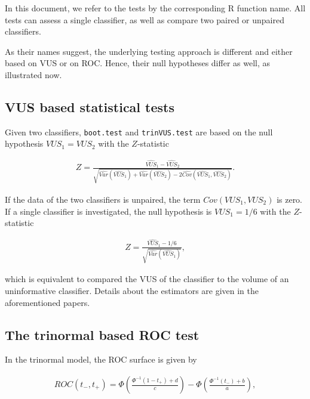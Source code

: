 \documentclass[
]{article}
\begin{document}
In this document, we refer to the tests by the corresponding R function
name. All tests can assess a single classifier, as well as compare two
paired or unpaired classifiers.

As their names suggest, the underlying testing approach is different and
either based on VUS or on ROC. Hence, their null hypotheses differ as
well, as illustrated now.

\hypertarget{vus-based-statistical-tests}{%
\subsection{VUS based statistical
tests}\label{vus-based-statistical-tests}}

Given two classifiers, \texttt{boot.test} and \texttt{trinVUS.test} are
based on the null hypothesis \(VUS_1 = VUS_2\) with the \(Z\)-statistic

\begin{align*}
Z =  \frac{\widehat{VUS}_1 - \widehat{VUS}_2}{\sqrt{\widehat{Var}(\widehat{VUS}_1) + \widehat{Var}(\widehat{VUS}_2) - 2 \widehat{Cov}(\widehat{VUS}_1,\widehat{VUS}_2)}}.
\end{align*}

If the data of the two classifiers is unpaired, the term
\(Cov(VUS_1,VUS_2)\) is zero. If a single classifier is investigated,
the null hypothesis is \(VUS_1 = 1/6\) with the \(Z\)-statistic

\begin{align*}
Z =  \frac{\widehat{VUS}_1 - 1/6}{\sqrt{\widehat{Var}(\widehat{VUS}_1)}},
\end{align*}

which is equivalent to compared the VUS of the classifier to the volume
of an uninformative classifier. Details about the estimators are given
in the aforementioned papers.

\hypertarget{the-trinormal-based-roc-test}{%
\subsection{The trinormal based ROC
test}\label{the-trinormal-based-roc-test}}

In the trinormal model, the ROC surface is given by

\begin{align*}
ROC(t_-,t_+) = \Phi \left(\frac{\Phi^{-1} (1-t_+) + d}{ c} \right) - \Phi \left(\frac{\Phi^{-1} (t_-)+b}{a} \right),
\end{align*}
\end{document}
